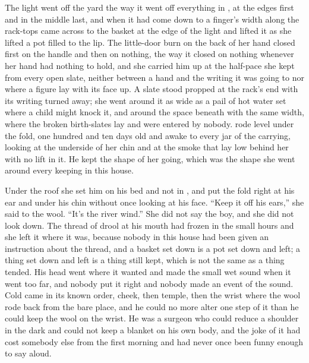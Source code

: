 The light went off the yard the way it went off everything in , at the edges first and in the middle last, and when it had come down to a finger's width along the rack-tops  came across to the basket at the edge of the light and lifted it as she lifted a pot filled to the lip. The little-door burn on the back of her hand closed first on the handle and then on nothing, the way it closed on nothing whenever her hand had nothing to hold, and she carried him up  at the half-pace she kept from every open slate, neither between a hand and the writing it was going to nor where a figure lay with its face up. A slate stood propped at the rack's end with its writing turned away; she went around it as wide as a pail of hot water set where a child might knock it, and around the space beneath  with the same width, where the broken birth-slates lay and were entered by nobody.  rode level under the fold, one hundred and ten days old and awake to every jar of the carrying, looking at the underside of her chin and at the smoke that lay low behind her with no lift in it. He kept the shape of her going, which was the shape she went around every keeping in this house.

Under the  roof she set him on his bed and not in , and put the fold right at his ear and under his chin without once looking at his face. “Keep it off his ears,” she said to the wool. “It's the river wind.” She did not say the boy, and she did not look down. The thread of drool at his mouth had frozen in the small hours and she left it where it was, because nobody in this house had been given an instruction about the thread, and a basket set down is a pot set down and left; a thing set down and left is a thing still kept, which is not the same as a thing tended. His head went where it wanted and made the small wet sound when it went too far, and nobody put it right and nobody made an event of the sound. Cold came in its known order, cheek, then temple, then the wrist where the wool rode back from the bare place, and he could no more alter one step of it than he could keep the wool on the wrist. He was a surgeon who could reduce a shoulder in the dark and could not keep a blanket on his own body, and the joke of it had cost somebody else from the first morning and had never once been funny enough to say aloud.

